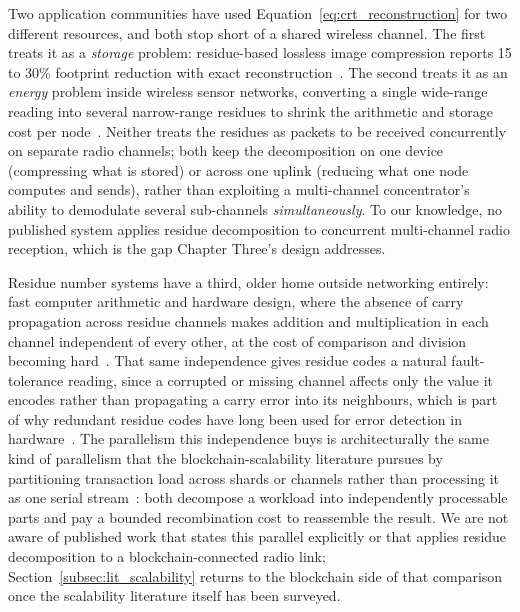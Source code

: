 \documentclass[12pt,a4paper,oneside]{book}
\begin{document}
Two application communities have used Equation~\ref{eq:crt_reconstruction}
for two different resources, and both stop short of a shared wireless
channel. The first treats it as a \emph{storage} problem: residue-based
lossless image compression reports 15 to 30\% footprint reduction with
exact reconstruction~\cite{vidhya2021crt}. The second treats it as an
\emph{energy} problem inside wireless sensor networks, converting a
single wide-range reading into several narrow-range residues to shrink the
arithmetic and storage cost per node~\cite{rahman2022rnsenergy,
khan2023fuzzycrt, djeddi2025parallelCRT}. Neither treats the residues as
packets to be received concurrently on separate radio channels; both keep
the decomposition on one device (compressing what is stored) or across one
uplink (reducing what one node computes and sends), rather than exploiting
a multi-channel concentrator's ability to demodulate several sub-channels
\emph{simultaneously}. To our knowledge, no published system applies
residue decomposition to concurrent multi-channel radio reception, which
is the gap Chapter Three's design addresses.

Residue number systems have a third, older home outside networking
entirely: fast computer arithmetic and hardware design, where the absence
of carry propagation across residue channels makes addition and
multiplication in each channel independent of every other, at the cost of
comparison and division becoming hard~\cite{ding1996remainder,
parhami2010computer}. That same independence gives residue codes a natural
fault-tolerance reading, since a corrupted or missing channel affects only
the value it encodes rather than propagating a carry error into its
neighbours, which is part of why redundant residue codes have long been
used for error detection in
hardware~\cite{knuth1997art, hardy2008introduction}. The parallelism this
independence buys is architecturally the same kind of parallelism that the
blockchain-scalability literature pursues by partitioning transaction load
across shards or channels rather than processing it as one serial
stream~\cite{horvath2025assistedsharding, anonndoptimizedcloud}: both
decompose a workload into independently processable parts and pay a
bounded recombination cost to reassemble the result. We are not aware of
published work that states this parallel explicitly or that applies
residue decomposition to a blockchain-connected radio link;
Section~\ref{subsec:lit_scalability} returns to the blockchain side of
that comparison once the scalability literature itself has been surveyed.
\end{document}
